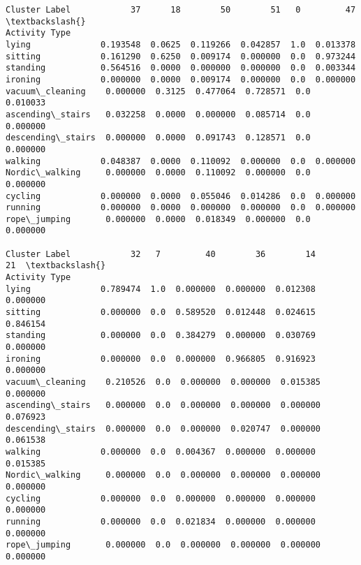 \documentclass[11pt]{article}
\makeatletter
\newcommand{\boxspacing}{\kern\kvtcb@left@rule\kern\kvtcb@boxsep}
\newcommand{\prompt}[4]{
        \ttfamily\llap{{\color{#2}[#3]:\hspace{3pt}#4}}\vspace{-\baselineskip}
    }
\makeatother
\begin{document}
            \begin{tcolorbox}[breakable, size=fbox, boxrule=.5pt, pad at break*=1mm, opacityfill=0]
\prompt{Out}{outcolor}{93}{\boxspacing}
\begin{Verbatim}[commandchars=\\\{\}]
Cluster Label            37      18        50        51   0         47  \textbackslash{}
Activity Type
lying              0.193548  0.0625  0.119266  0.042857  1.0  0.013378
sitting            0.161290  0.6250  0.009174  0.000000  0.0  0.973244
standing           0.564516  0.0000  0.000000  0.000000  0.0  0.003344
ironing            0.000000  0.0000  0.009174  0.000000  0.0  0.000000
vacuum\_cleaning    0.000000  0.3125  0.477064  0.728571  0.0  0.010033
ascending\_stairs   0.032258  0.0000  0.000000  0.085714  0.0  0.000000
descending\_stairs  0.000000  0.0000  0.091743  0.128571  0.0  0.000000
walking            0.048387  0.0000  0.110092  0.000000  0.0  0.000000
Nordic\_walking     0.000000  0.0000  0.110092  0.000000  0.0  0.000000
cycling            0.000000  0.0000  0.055046  0.014286  0.0  0.000000
running            0.000000  0.0000  0.000000  0.000000  0.0  0.000000
rope\_jumping       0.000000  0.0000  0.018349  0.000000  0.0  0.000000

Cluster Label            32   7         40        36        14        21  \textbackslash{}
Activity Type
lying              0.789474  1.0  0.000000  0.000000  0.012308  0.000000
sitting            0.000000  0.0  0.589520  0.012448  0.024615  0.846154
standing           0.000000  0.0  0.384279  0.000000  0.030769  0.000000
ironing            0.000000  0.0  0.000000  0.966805  0.916923  0.000000
vacuum\_cleaning    0.210526  0.0  0.000000  0.000000  0.015385  0.000000
ascending\_stairs   0.000000  0.0  0.000000  0.000000  0.000000  0.076923
descending\_stairs  0.000000  0.0  0.000000  0.020747  0.000000  0.061538
walking            0.000000  0.0  0.004367  0.000000  0.000000  0.015385
Nordic\_walking     0.000000  0.0  0.000000  0.000000  0.000000  0.000000
cycling            0.000000  0.0  0.000000  0.000000  0.000000  0.000000
running            0.000000  0.0  0.021834  0.000000  0.000000  0.000000
rope\_jumping       0.000000  0.0  0.000000  0.000000  0.000000  0.000000


\end{Verbatim}
\end{tcolorbox}
\end{document}
